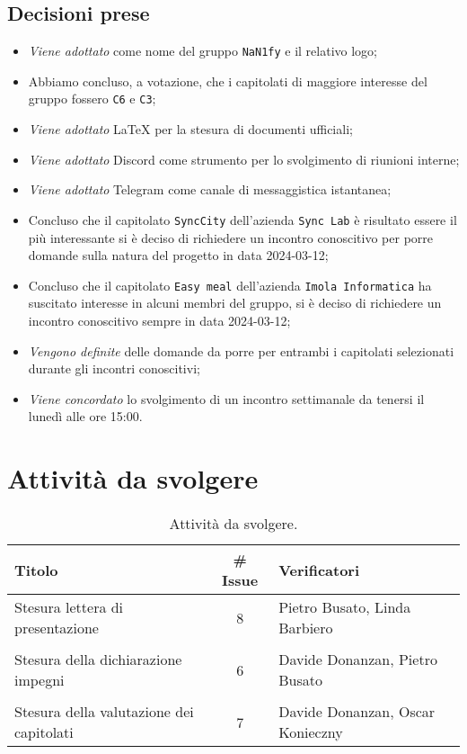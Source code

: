 \subsection{Decisioni prese}
\begin{itemize}
	\setlength\itemsep{0em}
	\item \textit{Viene adottato} come nome del gruppo \texttt{NaN1fy} e il relativo logo;
	\item Abbiamo concluso, a votazione, che i capitolati di maggiore interesse del gruppo fossero \texttt{C6} e \texttt{C3};
	\item \textit{Viene adottato} \LaTeX\: per la stesura di documenti ufficiali;
	\item \textit{Viene adottato} Discord come strumento per lo svolgimento di riunioni interne;
	\item \textit{Viene adottato} Telegram come canale di messaggistica istantanea;
	\item Concluso che il capitolato \texttt{SyncCity} dell’azienda \texttt{Sync Lab} è risultato essere il più interessante si è deciso di richiedere un incontro conoscitivo per porre domande sulla natura del progetto in data 2024-03-12;
	\item Concluso che il capitolato \texttt{Easy meal} dell’azienda \texttt{Imola Informatica} ha suscitato interesse in alcuni membri del gruppo, si è deciso di richiedere un incontro conoscitivo sempre in data 2024-03-12;
	\item \textit{Vengono definite} delle domande da porre per entrambi i capitolati selezionati durante gli incontri conoscitivi;
	\item \textit{Viene concordato} lo svolgimento di un incontro settimanale da tenersi il lunedì alle ore 15:00.
\end{itemize}
\section{Attività da svolgere}
\begin{table}[ht!]
	\centering
	\begin{tabular}{lcl}
		\toprule
		\textbf{Titolo} & \textbf{\# Issue} & \textbf{Verificatori} \\
		\midrule
		Stesura lettera di presentazione & 8 & Pietro Busato, Linda Barbiero\\\\
		Stesura della dichiarazione impegni  &  6 & Davide Donanzan, Pietro Busato \\\\
		Stesura della valutazione dei capitolati & 7 & Davide Donanzan, Oscar Konieczny \\
		\bottomrule
	\end{tabular}
	\caption{Attività da svolgere.}
	\label{table:Attivita da svolgere}
\end{table}


